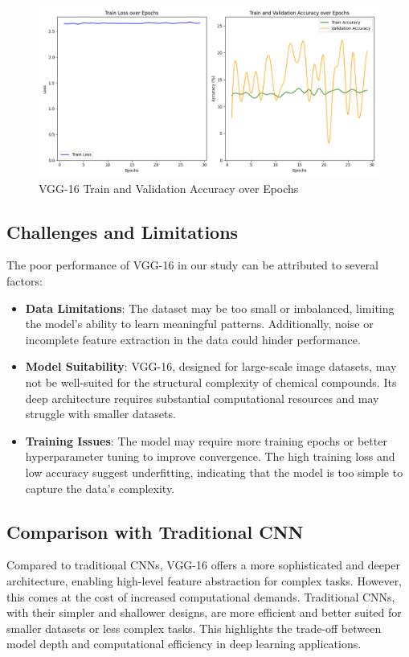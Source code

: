 \documentclass{mcmthesis}
\begin{document}
\begin{figure}[htbp]
    \centering
    \includegraphics[width=\textwidth]{pics/VGG_pic2.png}
    \caption{VGG-16 Train and Validation Accuracy over Epochs}
    \label{fig:VGG_pic2}
\end{figure}

\subsection{Challenges and Limitations}
The poor performance of VGG-16 in our study can be attributed to several factors:
\begin{itemize}
    \item \textbf{Data Limitations}: The dataset may be too small or imbalanced, limiting the model's ability to learn meaningful patterns. Additionally, noise or incomplete feature extraction in the data could hinder performance.
    \item \textbf{Model Suitability}: VGG-16, designed for large-scale image datasets, may not be well-suited for the structural complexity of chemical compounds. Its deep architecture requires substantial computational resources and may struggle with smaller datasets.
    \item \textbf{Training Issues}: The model may require more training epochs or better hyperparameter tuning to improve convergence. The high training loss and low accuracy suggest underfitting, indicating that the model is too simple to capture the data's complexity.
\end{itemize}

\subsection{Comparison with Traditional CNN}
Compared to traditional CNNs, VGG-16 offers a more sophisticated and deeper architecture, enabling high-level feature abstraction for complex tasks. However, this comes at the cost of increased computational demands. Traditional CNNs, with their simpler and shallower designs, are more efficient and better suited for smaller datasets or less complex tasks. This highlights the trade-off between model depth and computational efficiency in deep learning applications.
\end{document}
